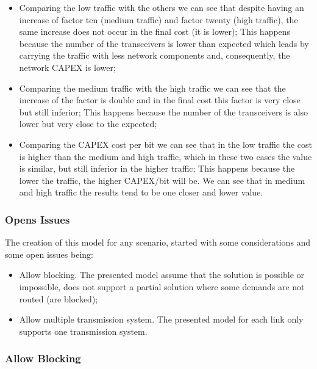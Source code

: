 \begin{itemize}
  \item Comparing the low traffic with the others we can see that despite having an increase of factor ten (medium traffic) and factor twenty (high traffic), the same increase does not occur in the final cost (it is lower);
  \subitem This happens because the number of the transceivers is lower than expected which leads by carrying the traffic with less network components and, consequently, the network CAPEX is lower;
  \item Comparing the medium traffic with the high traffic we can see that the increase of the factor is double and in the final cost this factor is very close but still inferior;
  \subitem This happens because the number of the transceivers is also lower but very close to the expected;
  \item Comparing the CAPEX cost per bit we can see that in the low traffic the cost is higher than the medium and high traffic, which in these two cases the value is similar, but still inferior in the higher traffic;
  \subitem This happens because the lower the traffic, the higher CAPEX/bit will be. We can see that in medium and high traffic the results tend to be one closer and lower value.
\end{itemize}

\vspace{13pt}
\subsubsection{Opens Issues}

The creation of this model for any scenario, started with some considerations and some open issues being:

\begin{itemize}
  \item Allow blocking.
  \subitem The presented model assume that the solution is possible or impossible, does not support a partial solution where some demands are not routed (are blocked);
  \item Allow multiple transmission system.
  \subitem The presented model for each link only supports one transmission system.
\end{itemize}


\newpage
\vspace{11pt}

\subsubsection{Allow Blocking}

